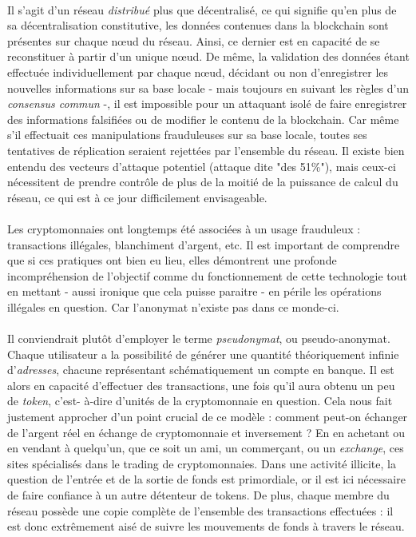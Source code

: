 \paragraph{} Il s'agit d'un réseau \emph{distribué} plus que décentralisé, ce qui signifie qu'en plus de sa décentralisation
constitutive, les données contenues dans la blockchain sont présentes sur chaque n\oe{}ud du réseau. Ainsi, ce dernier est
en capacité de se reconstituer à partir d'un unique n\oe{}ud. De même, la validation des données étant effectuée individuellement
par chaque n\oe{}ud, décidant ou non d'enregistrer les nouvelles informations sur sa base locale - mais toujours en suivant 
les règles d'un \emph{consensus commun} -, il est impossible pour un attaquant isolé de faire enregistrer des informations 
falsifiées ou de modifier le contenu de la blockchain. Car même s'il effectuait ces manipulations frauduleuses sur sa base
locale, toutes ses tentatives de réplication seraient rejettées par l'ensemble du réseau. Il existe bien entendu des vecteurs
d'attaque potentiel (attaque dite "des 51\%"), mais ceux-ci nécessitent de prendre contrôle de plus de la moitié de la puissance
de calcul du réseau, ce qui est à ce jour difficilement envisageable.

\paragraph{} Les cryptomonnaies ont longtemps été associées à un usage frauduleux : transactions illégales, blanchiment d'argent, etc.
Il est important de comprendre que si ces pratiques ont bien eu lieu, elles démontrent une profonde incompréhension de 
l'objectif comme du fonctionnement de cette technologie tout en mettant - aussi ironique que cela puisse paraitre - en 
périle les opérations illégales en question. Car l'anonymat n'existe pas dans ce monde-ci.

\paragraph{} Il conviendrait plutôt d'employer le terme \emph{pseudonymat}, ou pseudo-anonymat. Chaque utilisateur a la
possibilité de générer une quantité théoriquement infinie d'\emph{adresses}, chacune représentant schématiquement un compte
en banque. Il est alors en capacité d'effectuer des transactions, une fois qu'il aura obtenu un peu de \emph{token}, c'est-
à-dire d'unités de la cryptomonnaie en question. Cela nous fait justement approcher d'un point crucial de ce modèle : 
comment peut-on échanger de l'argent réel en échange de cryptomonnaie et inversement ? En en achetant ou en vendant à quelqu'un,
que ce soit un ami, un commerçant, ou un \emph{exchange}, ces sites spécialisés dans le trading de cryptomonnaies. Dans 
une activité illicite, la question de l'entrée et de la sortie de fonds est primordiale, or il est ici nécessaire de faire 
confiance à un autre détenteur de tokens. De plus, chaque membre du réseau possède une copie complète de l'ensemble des 
transactions effectuées : il est donc extrêmement aisé de suivre les mouvements de fonds à travers le réseau.

